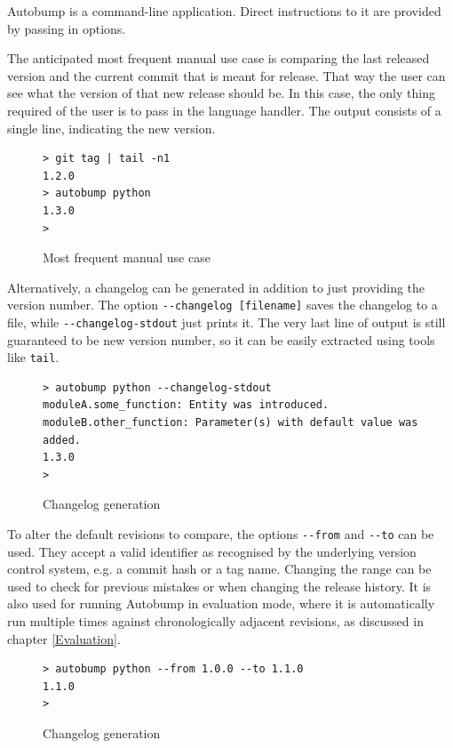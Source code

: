 \documentclass{l4proj}
\newcommand\genericstyle{\lstset{basicstyle=\ttm}}
\newcommand\codeinline[1]{{\genericstyle\lstinline!#1!}}
\begin{document}
Autobump is a command-line application. Direct instructions to it are
provided by passing in options.

The anticipated most frequent manual use case is comparing the last
released version and the current commit that is meant for release.
That way the user can see what the version of that new release should
be. In this case, the only thing required of the user is to pass in
the language handler. The output consists of a single line, indicating
the new version.

\begin{figure}[H]
\centering
\caption{Most frequent manual use case}
\begin{BVerbatim}
> git tag | tail -n1
1.2.0
> autobump python
1.3.0
>
\end{BVerbatim}
\end{figure}

Alternatively, a changelog can be generated in addition to just
providing the version number. The option \codeinline{--changelog
[filename]} saves the changelog to a file, while
\codeinline{--changelog-stdout} just prints it. The very last line of
output is still guaranteed to be new version number, so it can be
easily extracted using tools like \codeinline{tail}.

\begin{figure}[H]
\centering
\caption{Changelog generation}
\begin{BVerbatim}
> autobump python --changelog-stdout
moduleA.some_function: Entity was introduced.
moduleB.other_function: Parameter(s) with default value was added.
1.3.0
>
\end{BVerbatim}
\end{figure}

To alter the default revisions to compare, the options
\codeinline{--from} and \codeinline{--to} can be used. They accept a
valid identifier as recognised by the underlying version control
system, e.g. a commit hash or a tag name. Changing the range can be
used to check for previous mistakes or when changing the release
history. It is also used for running Autobump in evaluation mode,
where it is automatically run multiple times against chronologically
adjacent revisions, as discussed in chapter \ref{Evaluation}.

\begin{figure}[H]
\centering
\caption{Changelog generation}
\begin{BVerbatim}
> autobump python --from 1.0.0 --to 1.1.0
1.1.0
>
\end{BVerbatim}
\end{figure}
\end{document}
